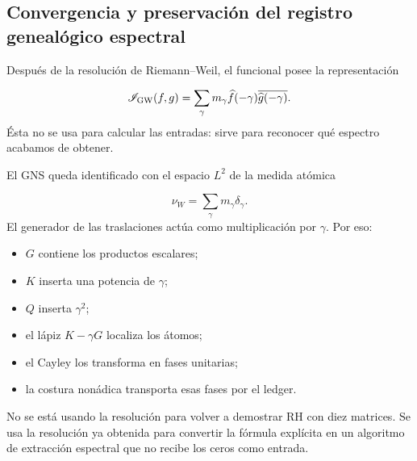 \subsection{Convergencia y preservación del registro genealógico espectral}
Después de la resolución de Riemann–Weil, el funcional posee la representación\par
\[
\mathscr I_{\rm GW}(f,g)
=
\sum_\gamma
m_\gamma
\widehat f(-\gamma)
\overline{\widehat g(-\gamma)}.
\]
Ésta no se usa para calcular las entradas: sirve para reconocer qué espectro acabamos de obtener.\par
El GNS queda identificado con el espacio \(L^2\) de la medida atómica\par
\[
\nu_W=\sum_\gamma m_\gamma\delta_\gamma.
\]
El generador de las traslaciones actúa como multiplicación por \(\gamma\). Por eso:\par
\begin{itemize}
\item \(G\) contiene los productos escalares;
\item \(K\) inserta una potencia de \(\gamma\);
\item \(Q\) inserta \(\gamma^2\);
\item el lápiz \(K-\gamma G\) localiza los átomos;
\item el Cayley los transforma en fases unitarias;
\item la costura nonádica transporta esas fases por el ledger.
\end{itemize}
No se está usando la resolución para volver a demostrar RH con diez matrices. Se usa la resolución ya obtenida para convertir la fórmula explícita en un algoritmo de extracción espectral que no recibe los ceros como entrada.\par
{}
